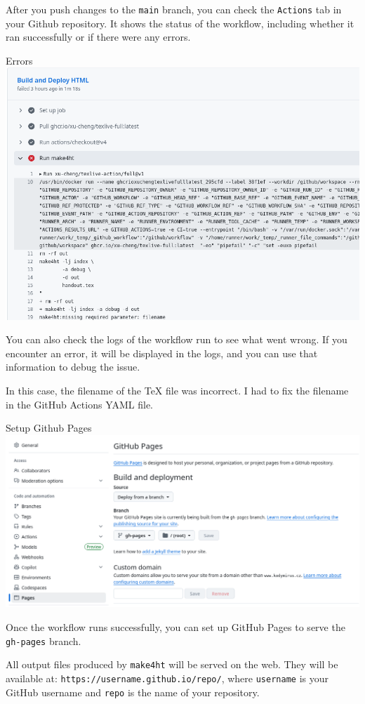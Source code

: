 After you push changes to the \texttt{main} branch, you can check the \texttt{Actions} tab in your
Github repository. It shows the status of the workflow, including whether it ran successfully or if there were any errors.


\begin{frame}[fragile]{Errors}
  \includegraphics[width=\textwidth]{img/github-error.png}
\end{frame}


You can also check the logs of the workflow run to see what went wrong.
If you encounter an error, it will be displayed in the logs, and you can use that
information to debug the issue.

In this case, the filename of the TeX file was incorrect. I had to fix the filename in the GitHub Actions YAML file.


\begin{frame}[fragile]{Setup Github Pages}
  \includegraphics[width=\textwidth]{img/github-pages.png}
\end{frame}

Once the workflow runs successfully, you can set up GitHub Pages to serve the \texttt{gh-pages} branch.

All output files produced by \texttt{make4ht} will be served on the web.
They will be available at:
\verb|https://username.github.io/repo/|,
where \texttt{username} is your GitHub username and \texttt{repo} is the name of your repository.

